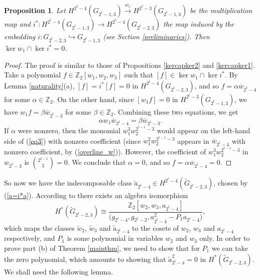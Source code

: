 \documentclass{amsart}
\newtheorem{proposition}[theorem]{Proposition}
\theoremstyle{definition}
\theoremstyle{remark}
\numberwithin{equation}{section}
\begin{document}
\begin{proposition}\label{kercapker3}
   Let $H^{2^t-4}(G_{2^t-1,3})\stackrel{w_1}\longrightarrow H^{2^t-3}(G_{2^t-1,3})$ be the multiplication map and $i^*:H^{2^t-4}(G_{2^t-1,3})\rightarrow H^{2^t-4}(G_{2^t-2,3})$ the map induced by the embedding $i:G_{2^t-2,3}\hookrightarrow G_{2^t-1,3}$ (see Section \ref{preliminaries}). Then
    $\ker w_1\cap \ker i^* = 0$.
\end{proposition}
\begin{proof}
The proof is similar to those of Propositions \ref{kercapker2} and \ref{kercapker1}. Take a polynomial $f\in\mathbb Z_2[w_1,w_2,w_3]$ such that $[f]\in \ker w_1\cap \ker i^*$. By Lemma \ref{naturality}(a), $[f]=i^*[f]=0$ in $H^{2^t-4}(G_{2^t-2,3})$, and so $f = \alpha \overline w_{2^t-4}$ for some $\alpha\in\mathbb Z_2$. On the other hand, since $[w_1f]=0$ in $H^{2^t-3}(G_{2^t-1,3})$, we have $w_1f = \beta \overline w_{2^t-3}$ for some $\beta\in\mathbb Z_2$. Combining these two equations, we get 
\begin{equation}\label{eq3}
    \alpha w_1\overline w_{2^t-4} = \beta \overline w_{2^t-3}.
\end{equation}
If $\alpha$ were nonzero, then the monomial $w_1^3w_2^{2^{t-1}-3}$ would appear on the left-hand side of (\ref{eq3}) with nonzero coefficient (since $w_1^2w_2^{2^{t-1}-3}$ appears in $\overline w_{2^t-4}$ with nonzero coefficient, by (\ref{overline_w})). However, the coefficient of $w_1^3w_2^{2^{t-1}-3}$ in $\overline w_{2^t-3}$ is $\binom{2^{t-1}}{3}=0$. We conclude that $\alpha=0$, and so $f=\alpha\overline w_{2^t-4}=0$.
\end{proof}

So now we have the indecomposable class $\widetilde a_{2^t-4}\in H^{2^t-4}(\widetilde G_{2^t-2,3})$, chosen by (\ref{a=i*a}). According to \cite[Theorem B(2)]{BasuChakraborty} there exists an algebra isomorphism
\begin{equation}\label{isomorphism2^t-2}
 H^*(\widetilde G_{2^t-2,3})\cong\frac{\mathbb Z_2[w_2,w_3,a_{2^t-4}]}{\big(g_{2^t-4},g_{2^t-2},a_{2^t-4}^2-P_1a_{2^t-4}\big)},  
 \end{equation}
 which maps the classes $\widetilde w_2$, $\widetilde w_3$ and $\widetilde a_{2^t-4}$ to the cosets of $w_2$, $w_3$ and $a_{2^t-4}$ respectively, and $P_1$ is some polynomial in variables $w_2$ and $w_3$ only. In order to prove part (b) of Theorem \ref{mainthm}, we need to show that for $P_1$ we can take the zero polynomial, which amounts to showing that $\widetilde a_{2^t-4}^2=0$ in $H^*(\widetilde G_{2^t-2,3})$. We shall need the following lemma.
\end{document}

